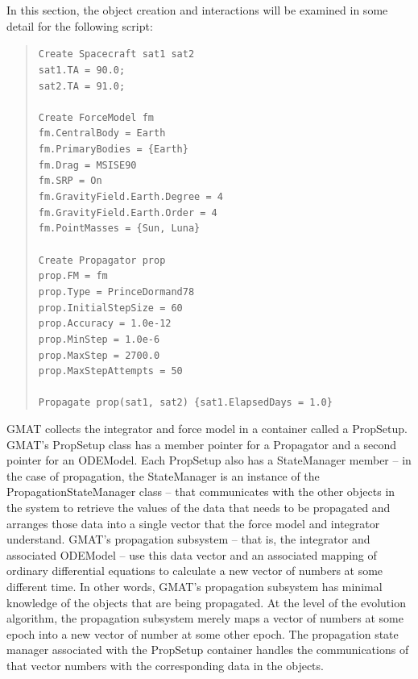 In this section, the object creation and interactions will be examined in some detail for the
following script:

\begin{quote}
\texttt{Create Spacecraft sat1 sat2\\
sat1.TA = 90.0;\\
sat2.TA = 91.0;\\
\\
Create ForceModel fm\\
fm.CentralBody = Earth\\
fm.PrimaryBodies = \{Earth\}\\
fm.Drag = MSISE90\\
fm.SRP = On\\
fm.GravityField.Earth.Degree = 4\\
fm.GravityField.Earth.Order = 4\\
fm.PointMasses = \{Sun, Luna\}\\
\\
Create Propagator prop\\
prop.FM = fm\\
prop.Type = PrinceDormand78\\
prop.InitialStepSize = 60\\
prop.Accuracy = 1.0e-12\\
prop.MinStep = 1.0e-6\\
prop.MaxStep = 2700.0\\
prop.MaxStepAttempts = 50\\
\\
Propagate prop(sat1, sat2) \{sat1.ElapsedDays = 1.0\}}
\end{quote}

GMAT collects the integrator and force model in a container called a PropSetup.  GMAT's PropSetup
class has a member pointer for a Propagator and a second pointer for an ODEModel.  Each PropSetup
also has a StateManager member -- in the case of propagation, the StateManager is an instance of the
PropagationStateManager class -- that communicates with the other objects in the system to retrieve
the values of the data that needs to be propagated and arranges those data into a single vector that
the force model and integrator understand. GMAT's propagation subsystem -- that is, the integrator
and associated ODEModel -- use this data vector and an associated mapping of ordinary differential
equations to calculate a new vector of numbers at some different time.  In other words, GMAT's
propagation subsystem has minimal knowledge of the objects that are being propagated.  At the level
of the evolution algorithm, the propagation subsystem merely maps a vector of numbers at some epoch
into a new vector of number at some other epoch.  The propagation state manager associated with the
PropSetup container handles the communications of that vector numbers with the corresponding data in
the objects.

